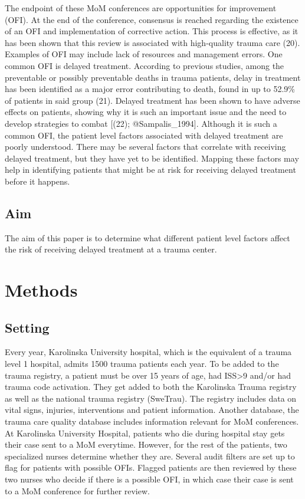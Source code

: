 \documentclass[
]{article}
\begin{document}
The endpoint of these MoM conferences are opportunities for improvement
(OFI). At the end of the conference, consensus is reached regarding the
existence of an OFI and implementation of corrective action. This
process is effective, as it has been shown that this review is
associated with high-quality trauma care (20). Examples of OFI may
include lack of resources and management errors. One common OFI is
delayed treatment. According to previous studies, among the preventable
or possibly preventable deaths in trauma patients, delay in treatment
has been identified as a major error contributing to death, found in up
to 52.9\% of patients in said group (21). Delayed treatment has been
shown to have adverse effects on patients, showing why it is such an
important issue and the need to develop strategies to combat {[}(22);
@Sampalis\_1994{]}. Although it is such a common OFI, the patient level
factors associated with delayed treatment are poorly understood. There
may be several factors that correlate with receiving delayed treatment,
but they have yet to be identified. Mapping these factors may help in
identifying patients that might be at risk for receiving delayed
treatment before it happens.

\hypertarget{aim}{%
\subsection{Aim}\label{aim}}

The aim of this paper is to determine what different patient level
factors affect the risk of receiving delayed treatment at a trauma
center.

\hypertarget{methods}{%
\section{Methods}\label{methods}}

\hypertarget{setting}{%
\subsection{Setting}\label{setting}}

Every year, Karolinska University hospital, which is the equivalent of a
trauma level 1 hospital, admits 1500 trauma patients each year. To be
added to the trauma registry, a patient must be over 15 years of age,
had ISS\textgreater9 and/or had trauma code activation. They get added
to both the Karolinska Trauma registry as well as the national trauma
registry (SweTrau). The registry includes data on vital signs, injuries,
interventions and patient information. Another database, the trauma care
quality database includes information relevant for MoM conferences. At
Karolinska University Hospital, patients who die during hospital stay
gets their case sent to a MoM everytime. However, for the rest of the
patients, two specialized nurses determine whether they are. Several
audit filters are set up to flag for patients with possible OFIs.
Flagged patients are then reviewed by these two nurses who decide if
there is a possible OFI, in which case their case is sent to a MoM
conference for further review.
\end{document}
